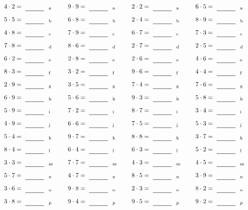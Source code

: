 \documentclass
[
  draft    = true,
  fontsize = 11pt,
  parskip  = half-
]
{scrartcl}
\begin{document}
\par\vfill\par
\begin{align*}
    \pline{4\cdot2}&=\rline{a}
  & \pline{9\cdot9}&=\rline{a}
  & \pline{2\cdot2}&=\rline{a}
  & \pline{6\cdot5}&=\rline{a} \\[1ex]
    \pline{5\cdot5}&=\rline{b}
  & \pline{6\cdot8}&=\rline{b}
  & \pline{2\cdot4}&=\rline{b}
  & \pline{8\cdot9}&=\rline{b} \\[1ex]
    \pline{4\cdot8}&=\rline{c}
  & \pline{7\cdot9}&=\rline{c}
  & \pline{6\cdot7}&=\rline{c}
  & \pline{7\cdot3}&=\rline{c} \\[1ex]
    \pline{7\cdot8}&=\rline{d}
  & \pline{8\cdot6}&=\rline{d}
  & \pline{2\cdot7}&=\rline{d}
  & \pline{2\cdot5}&=\rline{d} \\[1ex]
    \pline{6\cdot2}&=\rline{e}
  & \pline{2\cdot8}&=\rline{e}
  & \pline{2\cdot6}&=\rline{e}
  & \pline{4\cdot6}&=\rline{e} \\[1ex]
    \pline{8\cdot3}&=\rline{f}
  & \pline{3\cdot2}&=\rline{f}
  & \pline{9\cdot6}&=\rline{f}
  & \pline{4\cdot4}&=\rline{f} \\[1ex]
    \pline{2\cdot9}&=\rline{g}
  & \pline{3\cdot5}&=\rline{g}
  & \pline{7\cdot4}&=\rline{g}
  & \pline{7\cdot6}&=\rline{g} \\[1ex]
    \pline{6\cdot9}&=\rline{h}
  & \pline{5\cdot6}&=\rline{h}
  & \pline{9\cdot3}&=\rline{h}
  & \pline{5\cdot8}&=\rline{h} \\[1ex]
    \pline{5\cdot9}&=\rline{i}
  & \pline{7\cdot2}&=\rline{i}
  & \pline{8\cdot7}&=\rline{i}
  & \pline{3\cdot4}&=\rline{i} \\[1ex]
    \pline{4\cdot9}&=\rline{j}
  & \pline{6\cdot6}&=\rline{j}
  & \pline{7\cdot5}&=\rline{j}
  & \pline{5\cdot3}&=\rline{j} \\[1ex]
    \pline{5\cdot4}&=\rline{k}
  & \pline{9\cdot7}&=\rline{k}
  & \pline{8\cdot8}&=\rline{k}
  & \pline{3\cdot7}&=\rline{k} \\[1ex]
    \pline{8\cdot4}&=\rline{l}
  & \pline{6\cdot4}&=\rline{l}
  & \pline{6\cdot3}&=\rline{l}
  & \pline{5\cdot2}&=\rline{l} \\[1ex]
    \pline{3\cdot3}&=\rline{m}
  & \pline{7\cdot7}&=\rline{m}
  & \pline{4\cdot3}&=\rline{m}
  & \pline{4\cdot5}&=\rline{m} \\[1ex]
    \pline{5\cdot7}&=\rline{n}
  & \pline{4\cdot7}&=\rline{n}
  & \pline{8\cdot5}&=\rline{n}
  & \pline{3\cdot9}&=\rline{n} \\[1ex]
    \pline{3\cdot6}&=\rline{o}
  & \pline{9\cdot8}&=\rline{o}
  & \pline{2\cdot3}&=\rline{o}
  & \pline{8\cdot2}&=\rline{o} \\[1ex]
    \pline{3\cdot8}&=\rline{p}
  & \pline{9\cdot4}&=\rline{p}
  & \pline{9\cdot5}&=\rline{p}
  & \pline{9\cdot2}&=\rline{p}
\end{align*}
\end{document}
